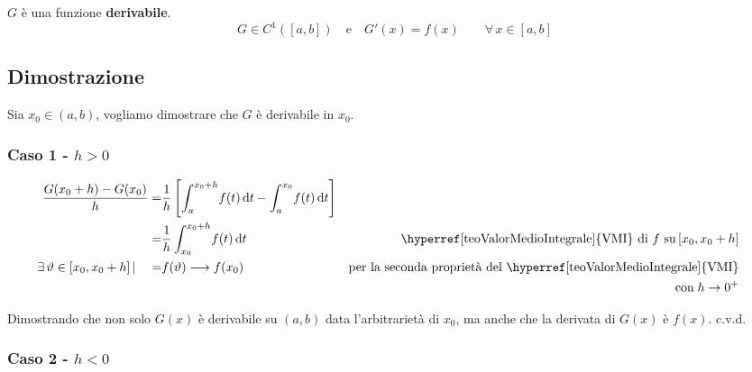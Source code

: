 \documentclass[../../analisi1]{subfiles}
\begin{document}
                        \(G\) è una funzione \textbf{derivabile}.
                        \[G \in C^{1}([a, b]) \quad \text{e} \quad G'(x) = f(x) \qquad \forall \, x \in [a,b] \]
        
                    \subsection*{Dimostrazione}

                        Sia \(x_0 \in (a,b) \), vogliamo dimostrare che \(G\) è derivabile in \(x_0\).

                        \subsubsection*{Caso 1 - \(h>0\)}

                            \begin{align*}
                                \frac{G(x_0+h) - G(x_0)}{h} =& \frac{1}{h} \left[ \int_{a}^{x_0+h} \! f(t) \, \mathrm{d}t - \int_{a}^{x_0} \! f(t) \, \mathrm{d}t \right] \\
                                                            =& \frac{1}{h} \int_{x_0}^{x_0+h} \! f(t) \, \mathrm{d}t & \text{\hyperref[teoValorMedioIntegrale]{VMI} di \(f\) su} \, [x_0, {x_0} +h]\\
                                \exists \, \vartheta \in [x_0, x_0+h] \, | \quad =& f(\vartheta) \longrightarrow f(x_0)          & \text{per la seconda proprietà del \hyperref[teoValorMedioIntegrale]{VMI}}& \\
                                &                            &  \text{con} \; h \rightarrow 0^{+}&
                            \end{align*}
                            
                            Dimostrando che non solo \(G(x)\) è derivabile su \((a,b)\) data l'arbitrarietà di \(x_0\), 
                            ma anche che la derivata di \(G(x)\) è \(f(x)\). c.v.d.

                        \subsubsection*{Caso 2 - \(h<0\)}
\end{document}
